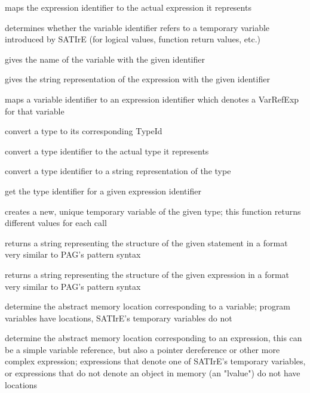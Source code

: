 \documentclass[a4paper,12pt]{report}
\begin{document}
\begin{description}
    maps the expression identifier to the actual expression it represents

    determines whether the variable identifier refers to a temporary
    variable introduced by SATIrE (for logical values, function return
    values, etc.)

    gives the name of the variable with the given identifier

    gives the string representation of the expression with the given
    identifier

    maps a variable identifier to an expression identifier which denotes a
    VarRefExp for that variable

    convert a type to its corresponding TypeId

    convert a type identifier to the actual type it represents

    convert a type identifier to a string representation of the type

    get the type identifier for a given expression identifier

    creates a new, unique temporary variable of the given type; this
    function returns different values for each call

    returns a string representing the structure of the given statement in a
    format very similar to PAG's pattern syntax

    returns a string representing the structure of the given expression in a
    format very similar to PAG's pattern syntax

    determine the abstract memory location corresponding to a variable;
    program variables have locations, SATIrE's temporary variables do not

    determine the abstract memory location corresponding to an expression,
    this can be a simple variable reference, but also a pointer dereference
    or other more complex expression; expressions that denote one of
    SATIrE's temporary variables, or expressions that do not denote an
    object in memory (an "lvalue") do not have locations


\end{description}
\end{document}
